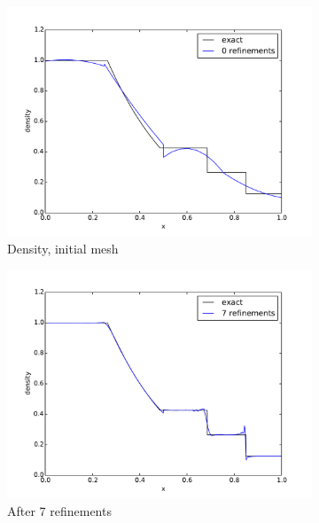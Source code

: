 \documentclass[preprint,12pt]{elsarticle}
\begin{document}
\begin{figure}[p]
\centering
\begin{subfigure}[c]{0.3\textwidth}
\centering
\includegraphics[width=\textwidth]{SpaceTimeCNS/Sod1e-5/den1.pdf}
\caption{Density, initial mesh}
\label{fig:sod_den0}
\end{subfigure}
\begin{subfigure}[c]{0.3\textwidth}
\centering
\includegraphics[width=\textwidth]{SpaceTimeCNS/Sod1e-5/den8.pdf}
\caption{After 7 refinements}
\label{fig:sod_den7}
\end{subfigure}
\begin{subfigure}[c]{0.3\textwidth}
\centering

\end{subfigure}
\end{figure}
\end{document}
